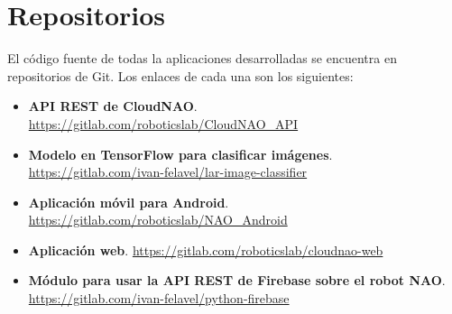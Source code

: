 \chapter{Repositorios \label{anexo:repos}}

El código fuente de todas la aplicaciones desarrolladas se encuentra
en repositorios de Git. Los enlaces de cada una son los siguientes:

\begin{itemize}
\item \textbf{API REST de CloudNAO}. 
\url{https://gitlab.com/roboticslab/CloudNAO_API}

\item \textbf{Modelo en TensorFlow para clasificar imágenes}.
\url{https://gitlab.com/ivan-felavel/lar-image-classifier}

\item \textbf{Aplicación móvil para Android}.
\url{https://gitlab.com/roboticslab/NAO_Android}

\item \textbf{Aplicación web}.
\url{https://gitlab.com/roboticslab/cloudnao-web}

\item \textbf{Módulo para usar la API REST de Firebase sobre el robot NAO}.
\url{https://gitlab.com/ivan-felavel/python-firebase}

\end{itemize}